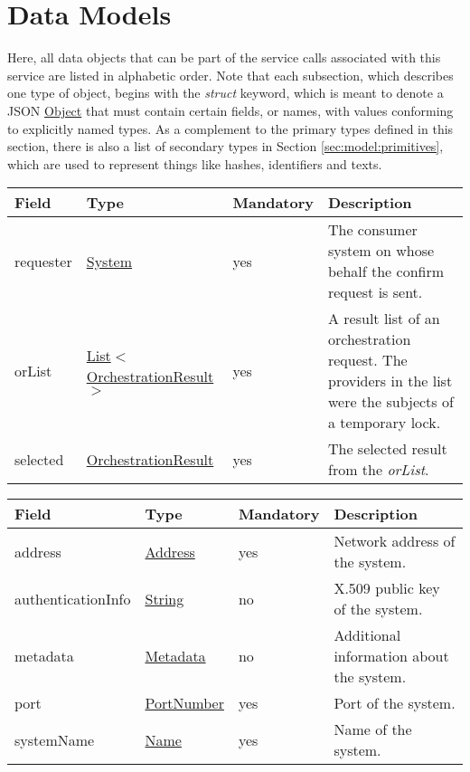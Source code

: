 \documentclass[a4paper]{arrowhead}
\newcommand{\pref}[1]{{\textcolor{ArrowheadGrey}{\hyperref[sec:model:primitives:#1]{#1}}}}
\begin{document}
\clearpage

\section{Data Models}
\label{sec:model}

Here, all data objects that can be part of the service calls associated with this service are listed in alphabetic order.
Note that each subsection, which describes one type of object, begins with the \textit{struct} keyword, which is meant to denote a JSON \pref{Object} that must contain certain fields, or names, with values conforming to explicitly named types.
As a complement to the primary types defined in this section, there is also a list of secondary types in Section \ref{sec:model:primitives}, which are used to represent things like hashes, identifiers and texts.

\label{sec:model:QoSReservationRequest}

\begin{table}[ht!]
\begin{tabularx}{\textwidth}{| p{4cm} | p{4cm} | p{2cm} | X |} \hline
\rowcolor{gray!33} Field & Type & Mandatory & Description \\ \hline
requester & \hyperref[sec:model:System]{System} & yes & The consumer system on whose behalf the confirm request is sent. \\ \hline
orList & \pref{List}$<$\hyperref[sec:model:OrchestrationResult]{OrchestrationResult}$>$ & yes & A result list of an orchestration request. The providers in the list were the subjects of a temporary lock. \\ \hline
selected & \hyperref[sec:model:OrchestrationResult]{OrchestrationResult} & yes & The selected result from the \textit{orList}. \\ \hline

\end{tabularx}
\end{table}

\label{sec:model:System}

\begin{table}[ht!]
\begin{tabularx}{\textwidth}{| p{4cm} | p{4cm} | p{2cm} | X |} \hline
\rowcolor{gray!33} Field & Type & Mandatory & Description \\ \hline

address &\pref{Address} & yes & Network address of the system. \\ \hline
authenticationInfo &\pref{String} & no & X.509 public key of the system. \\ \hline
metadata &\hyperref[sec:model:Metadata]{Metadata} & no & Additional information about the system. \\ \hline
port &\pref{PortNumber} & yes & Port of the system. \\ \hline
systemName &\pref{Name} & yes & Name of the system. \\ \hline
\end{tabularx}
\end{table}
\end{document}
